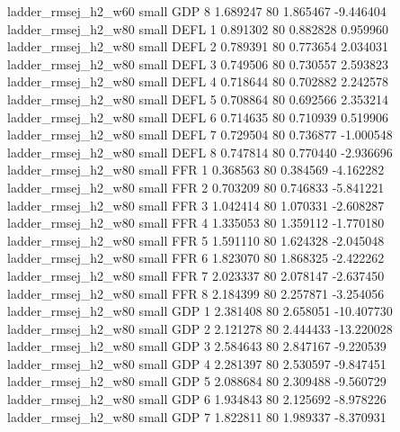      ladder_rmsej_h2_w60      small      GDP                 8 1.689247 80       1.865467          -9.446404
     ladder_rmsej_h2_w80      small     DEFL                 1 0.891302 80       0.882828           0.959960
     ladder_rmsej_h2_w80      small     DEFL                 2 0.789391 80       0.773654           2.034031
     ladder_rmsej_h2_w80      small     DEFL                 3 0.749506 80       0.730557           2.593823
     ladder_rmsej_h2_w80      small     DEFL                 4 0.718644 80       0.702882           2.242578
     ladder_rmsej_h2_w80      small     DEFL                 5 0.708864 80       0.692566           2.353214
     ladder_rmsej_h2_w80      small     DEFL                 6 0.714635 80       0.710939           0.519906
     ladder_rmsej_h2_w80      small     DEFL                 7 0.729504 80       0.736877          -1.000548
     ladder_rmsej_h2_w80      small     DEFL                 8 0.747814 80       0.770440          -2.936696
     ladder_rmsej_h2_w80      small      FFR                 1 0.368563 80       0.384569          -4.162282
     ladder_rmsej_h2_w80      small      FFR                 2 0.703209 80       0.746833          -5.841221
     ladder_rmsej_h2_w80      small      FFR                 3 1.042414 80       1.070331          -2.608287
     ladder_rmsej_h2_w80      small      FFR                 4 1.335053 80       1.359112          -1.770180
     ladder_rmsej_h2_w80      small      FFR                 5 1.591110 80       1.624328          -2.045048
     ladder_rmsej_h2_w80      small      FFR                 6 1.823070 80       1.868325          -2.422262
     ladder_rmsej_h2_w80      small      FFR                 7 2.023337 80       2.078147          -2.637450
     ladder_rmsej_h2_w80      small      FFR                 8 2.184399 80       2.257871          -3.254056
     ladder_rmsej_h2_w80      small      GDP                 1 2.381408 80       2.658051         -10.407730
     ladder_rmsej_h2_w80      small      GDP                 2 2.121278 80       2.444433         -13.220028
     ladder_rmsej_h2_w80      small      GDP                 3 2.584643 80       2.847167          -9.220539
     ladder_rmsej_h2_w80      small      GDP                 4 2.281397 80       2.530597          -9.847451
     ladder_rmsej_h2_w80      small      GDP                 5 2.088684 80       2.309488          -9.560729
     ladder_rmsej_h2_w80      small      GDP                 6 1.934843 80       2.125692          -8.978226
     ladder_rmsej_h2_w80      small      GDP                 7 1.822811 80       1.989337          -8.370931
